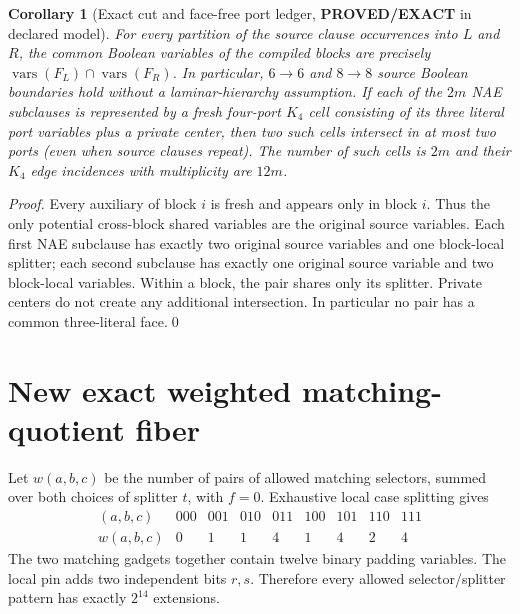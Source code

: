 \documentclass[11pt]{article}
\newtheorem{corollary}[theorem]{Corollary}
\newcommand{\EXACT}{\textbf{PROVED/EXACT}}
\begin{document}
\begin{corollary}[Exact cut and face-free port ledger, \EXACT{} in declared model]
For \emph{every} partition of the source clause occurrences into $L$ and
$R$, the common Boolean variables of the compiled blocks are precisely
$\operatorname{vars}(F_L)\cap\operatorname{vars}(F_R)$.
In particular, $6\to6$ and $8\to8$ source Boolean boundaries hold without
a laminar-hierarchy assumption.  If each of the $2m$ NAE subclauses is
represented by a fresh four-port $K_4$ cell consisting of its three literal
port variables plus a private center, then two such cells intersect in
at most two ports (even when source clauses repeat).  The number of such
cells is $2m$ and their $K_4$ edge incidences with multiplicity are $12m$.
\end{corollary}
\begin{proof}
Every auxiliary of block $i$ is fresh and appears only in block $i$.
Thus the only potential cross-block shared variables are the original
source variables.  Each first NAE subclause has exactly two original
source variables and one block-local splitter; each second subclause has
exactly one original source variable and two block-local variables.
Within a block, the pair shares only its splitter.  Private centers do not
create any additional intersection.  In particular no pair has a common
three-literal face.\qed
\end{proof}

\section{New exact weighted matching-quotient fiber}
Let $w(a,b,c)$ be the number of pairs of allowed matching selectors,
summed over both choices of splitter $t$, with $f=0$.  Exhaustive local
case splitting gives
\[
\begin{array}{c|rrrrrrrr}
(a,b,c)&000&001&010&011&100&101&110&111\\\hline
w(a,b,c)&0&1&1&4&1&4&2&4
\end{array}
\]
The two matching gadgets together contain twelve binary padding variables.
The local pin adds two independent bits $r,s$.  Therefore every allowed
selector/splitter pattern has exactly $2^{14}$ extensions.
\end{document}
